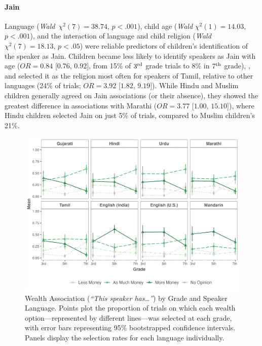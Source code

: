 \documentclass{foushee-adapted-preprint}
\begin{document}
\paragraph*{Jain} %
Language (\textit{Wald}~$\chi^2(7)=38.74$, $p<.001$), child age (\textit{Wald} $\chi^2(1)=14.03$, $p<.001$), and the interaction of language and child religion (\textit{Wald}~$\chi^2(7)=18.13$, $p<.05$) were reliable predictors of children's identification of the speaker as Jain. Children became less likely to identify speakers as Jain with age ($OR=0.84$ [$0.76$, $0.92$], from 15\% of $3^{\textnormal{rd}}$ grade trials to 8\% in $7^{\textnormal{th}}$ grade), 
, and selected it as the religion most often for speakers of Tamil, relative to other languages (24\% of trials; $OR=3.92$ [$1.82$, $9.19$]). 
While Hindu and Muslim children generally agreed on Jain associations (or their absence), they showed the greatest difference in associations with Marathi ($OR=3.77$ [$1.00$, $15.10$]), where Hindu children selected Jain on just 5\% of trials, compared to Muslim children's 21\%.
\begin{figure}
    \centering
    \includegraphics[width=1.2\linewidth]{figures/std_plots/wealth_std.png}
    \caption{Wealth Association (\emph{``This speaker has\ldots''}) by Grade and Speaker Language. Points plot the proportion of trials on which each wealth option---represented by different lines---was selected at each grade, with error bars representing 95\% bootstrapped confidence intervals. Panels display the selection rates for each language individually.}
    \label{fig:wealth}
\vspace{-10pt}
\end{figure}
\end{document}
